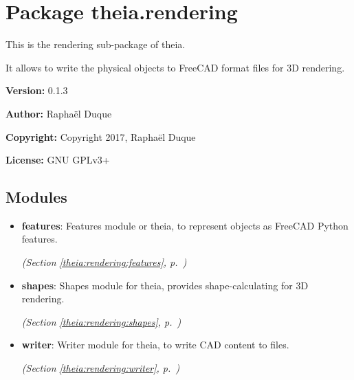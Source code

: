 %
%
%


\section{Package theia.rendering}

    \label{theia:rendering}
This is the rendering sub-package of theia.

It allows to write the physical objects to FreeCAD format files for 3D 
rendering.

\textbf{Version:} 0.1.3



\textbf{Author:} Raphaël Duque



\textbf{Copyright:} Copyright 2017, Raphaël Duque



\textbf{License:} GNU GPLv3+





\subsection{Modules}

\begin{itemize}
\setlength{\parskip}{0ex}
\item \textbf{features}: Features module or theia, to represent objects as FreeCAD Python features.



  \textit{(Section \ref{theia:rendering:features}, p.~\pageref{theia:rendering:features})}

\item \textbf{shapes}: Shapes module for theia, provides shape-calculating for 3D rendering.



  \textit{(Section \ref{theia:rendering:shapes}, p.~\pageref{theia:rendering:shapes})}

\item \textbf{writer}: Writer module for theia, to write CAD content to files.



  \textit{(Section \ref{theia:rendering:writer}, p.~\pageref{theia:rendering:writer})}

\end{itemize}

